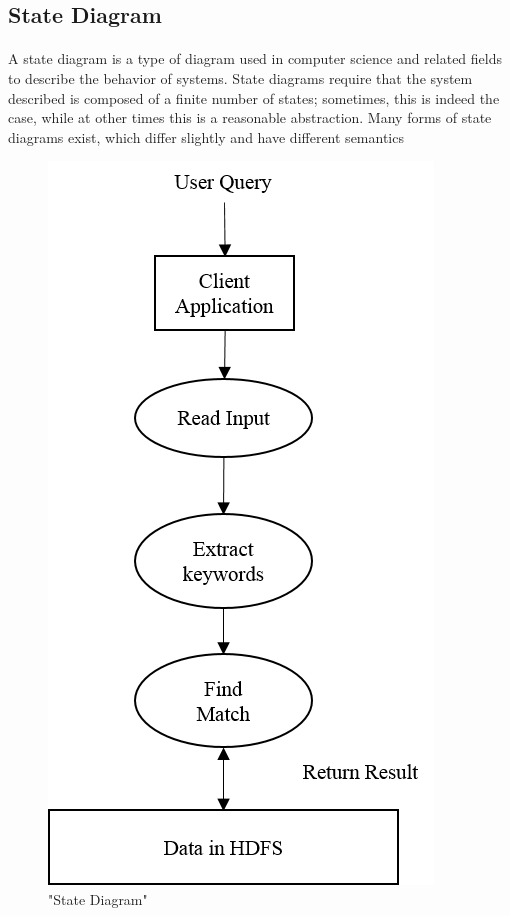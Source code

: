 \documentclass[oneside,a4paper,12pt]{report}
\begin{document}
\subsection{State Diagram}
\paragraph{}
A state diagram is a type of diagram used in computer science and related fields to describe the behavior of systems. State diagrams require that the system described is composed of a finite number of states; sometimes, this is indeed the case, while at other times this is a reasonable abstraction. Many forms of state diagrams exist, which differ slightly and have different semantics

\begin{figure}[H]
\includegraphics{state_diagram}
\centering
\caption{"State Diagram"}
\end{figure}
\end{document}

